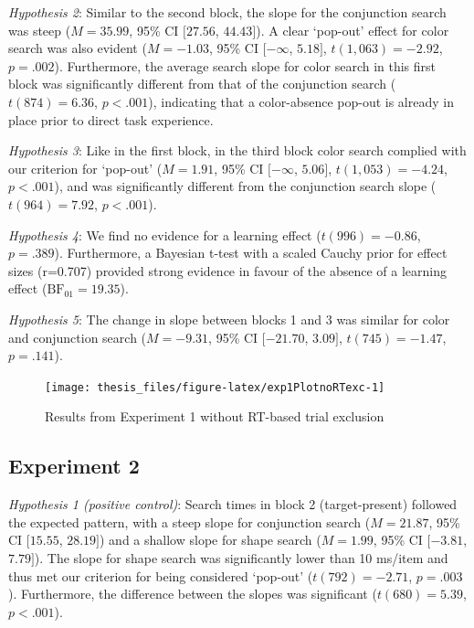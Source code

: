 \documentclass[12pt,twoside]{reedthesis}
\begin{document}
\emph{Hypothesis 2}: Similar to the second block, the slope for the conjunction search was steep (\(M = 35.99\), 95\% CI \([27.56\), \(44.43]\)). A clear `pop-out' effect for color search was also evident (\(M = -1.03\), 95\% CI \([-\infty\), \(5.18]\), \(t(1,063) = -2.92\), \(p = .002\)). Furthermore, the average search slope for color search in this first block was significantly different from that of the conjunction search (\(t(874) = 6.36\), \(p < .001\)), indicating that a color-absence pop-out is already in place prior to direct task experience.

\emph{Hypothesis 3}: Like in the first block, in the third block color search complied with our criterion for `pop-out' (\(M = 1.91\), 95\% CI \([-\infty\), \(5.06]\), \(t(1,053) = -4.24\), \(p < .001\)), and was significantly different from the conjunction search slope (\(t(964) = 7.92\), \(p < .001\)).

\emph{Hypothesis 4}: We find no evidence for a learning effect (\(t(996) = -0.86\), \(p = .389\)). Furthermore, a Bayesian t-test with a scaled Cauchy prior for effect sizes (r=0.707) provided strong evidence in favour of the absence of a learning effect (\(\mathrm{BF}_{\textrm{01}} = 19.35\)).

\emph{Hypothesis 5}: The change in slope between blocks 1 and 3 was similar for color and conjunction search (\(M = -9.31\), 95\% CI \([-21.70\), \(3.09]\), \(t(745) = -1.47\), \(p = .141\)).
\begin{figure}
\texttt{[image: thesis\_files/figure-latex/exp1PlotnoRTexc-1]} \caption{Results from Experiment 1 without RT-based trial exclusion}\label{fig:exp1PlotnoRTexc}
\end{figure}
\hypertarget{experiment-2-2}{%
\subsection{Experiment 2}\label{experiment-2-2}}

\emph{Hypothesis 1 (positive control)}: Search times in block 2 (target-present) followed the expected pattern, with a steep slope for conjunction search (\(M = 21.87\), 95\% CI \([15.55\), \(28.19]\)) and a shallow slope for shape search (\(M = 1.99\), 95\% CI \([-3.81\), \(7.79]\)). The slope for shape search was significantly lower than 10 ms/item and thus met our criterion for being considered `pop-out' (\(t(792) = -2.71\), \(p = .003\)). Furthermore, the difference between the slopes was significant (\(t(680) = 5.39\), \(p < .001\)).
\end{document}
